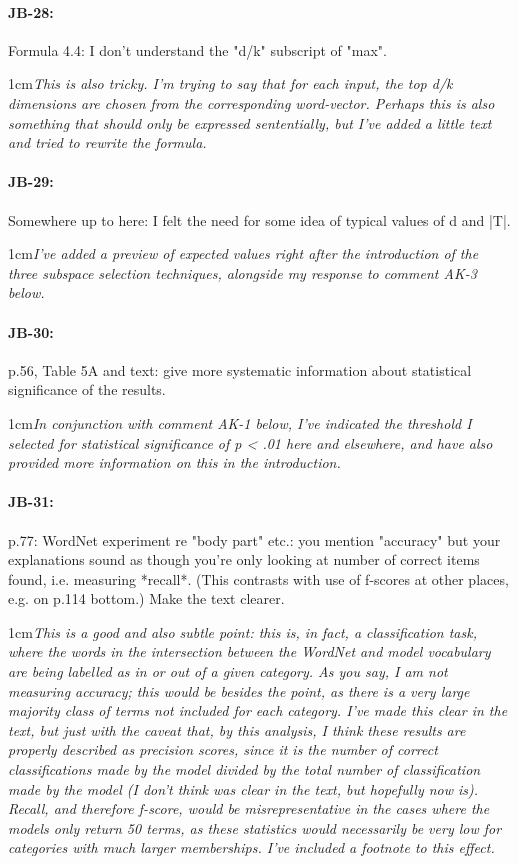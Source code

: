 \documentclass[11pt,a4paper]{article}
\newcommand{\res}[1]{\vspace{0.25cm} \begin{adjustwidth}{1cm}{}\emph{#1}\end{adjustwidth}}
\begin{document}
\paragraph{JB-28:} Formula 4.4: I don't understand the "d/k" subscript of "max".

\res{This is also tricky.  I'm trying to say that for each input, the top d/k dimensions are chosen from the corresponding word-vector.  Perhaps this is also something that should only be expressed sententially, but I've added a little text and tried to rewrite the formula.}

\paragraph{JB-29:} Somewhere up to here: I felt the need for some idea of typical values of d and |T|.

\res{I've added a preview of expected values right after the introduction of the three subspace selection techniques, alongside my response to comment AK-3 below.}

\paragraph{JB-30:} p.56, Table 5A and text: give more systematic information about statistical significance of the results.

\res{In conjunction with comment AK-1 below, I've indicated the threshold I selected for statistical significance of p < .01 here and elsewhere, and have also provided more information on this in the introduction.}

\paragraph{JB-31:} p.77: WordNet experiment re "body part" etc.: you mention "accuracy" but your explanations sound as though you're only looking at number of correct items found, i.e. measuring *recall*. (This contrasts with use of f-scores at other places, e.g. on p.114 bottom.) Make the text clearer.

\res{This is a good and also subtle point: this is, in fact, a classification task, where the words in the intersection between the WordNet and model vocabulary are being labelled as in or out of a given category.  As you say, I am not measuring accuracy; this would be besides the point, as there is a very large majority class of terms not included for each category.  I've made this clear in the text, but just with the caveat that, by this analysis, I think these results are properly described as precision scores, since it is the number of correct classifications made by the model divided by the total number of classification made by the model (I don't think was clear in the text, but hopefully now is).  Recall, and therefore f-score, would be misrepresentative in the cases where the models only return 50 terms, as these statistics would necessarily be very low for categories with much larger memberships.  I've included a footnote to this effect.}
\end{document}
